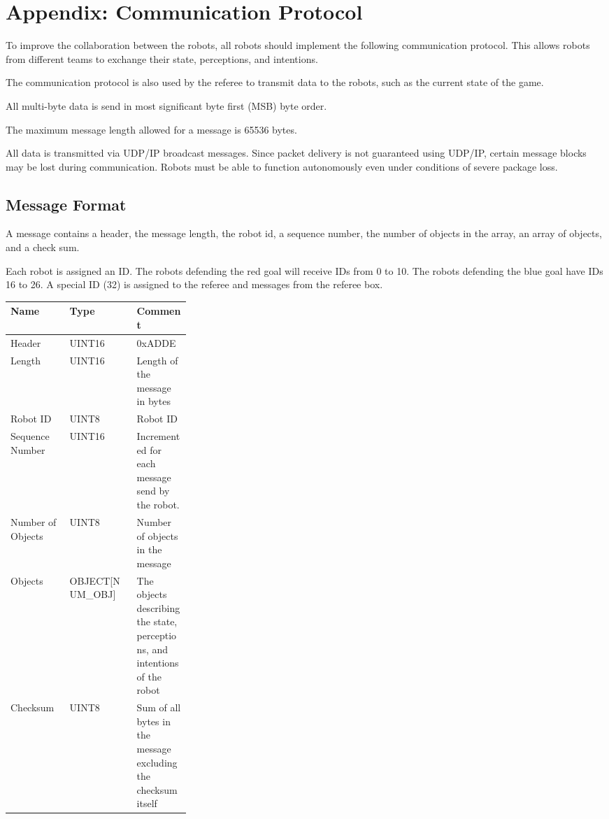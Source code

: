 \documentclass[12pt]{hurocup}
\begin{document}
\section*{Appendix: Communication Protocol}

To improve the collaboration between the robots, all robots should
implement the following communication protocol. This allows robots
from different teams to exchange their state, perceptions, and
intentions.

The communication protocol is also used by the referee to transmit
data to the robots, such as the current state of the game.

All multi-byte data is send in most significant byte first (MSB) byte
order. 

The maximum message length allowed for a message is 65536 bytes.

All data is transmitted via UDP/IP broadcast messages. Since packet
delivery is not guaranteed using UDP/IP, certain message blocks may be
lost during communication. Robots must be able to function
autonomously even under conditions of severe package loss.

\subsection*{Message Format}

A message contains a header, the message length, the robot id, a
sequence number, the number of objects in the array, an array of
objects, and a check sum.

Each robot is assigned an ID. The robots defending the red goal will
receive IDs from 0 to 10. The robots defending the blue goal have IDs
16 to 26. A special ID (32) is assigned to the referee and messages
from the referee box.


\begin{center}
\begin{tabular}[t]{|l|l|p{0.3\linewidth}|}
  \hline
  Name & Type & Comment \\
  \hline
  Header          & UINT16 & 0xADDE\\
  Length          & UINT16 & Length of the message in bytes\\
  Robot ID        & UINT8 & Robot ID\\
  Sequence Number & UINT16 & Incremented for each message send by the
                             robot.\\
  Number of Objects & UINT8 & Number of objects in the message\\
  Objects & OBJECT[NUM\_OBJ] & The objects describing the state, perceptions,
                     and intentions of the robot\\
  Checksum & UINT8 & Sum of all bytes in the message excluding the
                     checksum itself\\
  \hline
\end{tabular}
\end{center}
\end{document}
